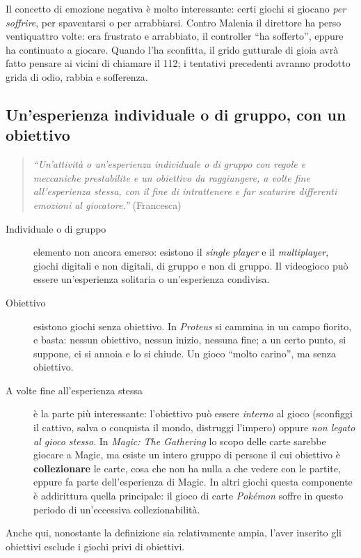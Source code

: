 Il concetto di emozione negativa è molto interessante: certi giochi si
giocano \emph{per soffrire}, per spaventarsi o per arrabbiarsi. Contro Malenia
il direttore ha perso ventiquattro volte: era frustrato e arrabbiato, il
controller ``ha sofferto'', eppure ha continuato a giocare. Quando l'ha
sconfitta, il grido gutturale di gioia avrà fatto pensare ai vicini di
chiamare il 112; i tentativi precedenti avranno prodotto grida di odio, rabbia
e sofferenza.

\subsection{Un'esperienza individuale o di gruppo, con un obiettivo}

\begin{quote}
\emph{``Un'attività o un'esperienza individuale o di gruppo con regole e
meccaniche prestabilite e un obiettivo da raggiungere, a volte fine
all'esperienza stessa, con il fine di intrattenere e far scaturire differenti
emozioni al giocatore.''} (Francesca)
\end{quote}

\begin{description}
  \item[Individuale o di gruppo] elemento non ancora emerso: esistono il
        \emph{single player} e il \emph{multiplayer}, giochi digitali e non
        digitali, di gruppo e non di gruppo. Il videogioco può essere
        un'esperienza solitaria o un'esperienza condivisa.
  \item[Obiettivo] esistono giochi senza obiettivo. In \emph{Proteus} si
        cammina in un campo fiorito, e basta: nessun obiettivo, nessun inizio,
        nessuna fine; a un certo punto, si suppone, ci si annoia e lo si
        chiude. Un gioco ``molto carino'', ma senza obiettivo.
  \item[A volte fine all'esperienza stessa] è la parte più interessante:
        l'obiettivo può essere \emph{interno} al gioco (sconfiggi il cattivo,
        salva o conquista il mondo, distruggi l'impero) oppure \emph{non
        legato al gioco stesso}. In \emph{Magic: The Gathering} lo scopo delle
        carte sarebbe giocare a Magic, ma esiste un intero gruppo di persone il
        cui obiettivo è \textbf{collezionare} le carte, cosa che non ha nulla
        a che vedere con le partite, eppure fa parte dell'esperienza di Magic.
        In altri giochi questa componente è addirittura quella principale: il
        gioco di carte \emph{Pokémon} soffre in questo periodo di un'eccessiva
        collezionabilità.
\end{description}
Anche qui, nonostante la definizione sia relativamente ampia, l'aver inserito
gli obiettivi esclude i giochi privi di obiettivi.

